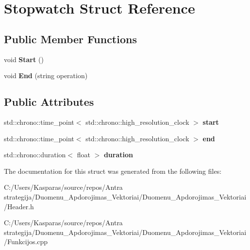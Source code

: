 \hypertarget{struct_stopwatch}{}\section{Stopwatch Struct Reference}
\label{struct_stopwatch}
\subsection*{Public Member Functions}
\begin{DoxyCompactItemize}
\item 
\mbox{\label{struct_stopwatch_adb93923510f12409132445fc187d828f}} 
void {\bfseries Start} ()
\item 
\mbox{\label{struct_stopwatch_a5fed6799222f1a0829df7e9eefaca3e4}} 
void {\bfseries End} (string operation)
\end{DoxyCompactItemize}
\subsection*{Public Attributes}
\begin{DoxyCompactItemize}
\item 
\mbox{\label{struct_stopwatch_aafe0ac2c25c4ecddd921562d765aef83}} 
std\+::chrono\+::time\+\_\+point$<$ std\+::chrono\+::high\+\_\+resolution\+\_\+clock $>$ {\bfseries start}
\item 
\mbox{\label{struct_stopwatch_a1827689dd0b76628b8d1861a27fb8fad}} 
std\+::chrono\+::time\+\_\+point$<$ std\+::chrono\+::high\+\_\+resolution\+\_\+clock $>$ {\bfseries end}
\item 
\mbox{\label{struct_stopwatch_a1779261e916c1cc75ac166f1cf583e5b}} 
std\+::chrono\+::duration$<$ float $>$ {\bfseries duration}
\end{DoxyCompactItemize}


The documentation for this struct was generated from the following files\+:\begin{DoxyCompactItemize}
\item 
C\+:/\+Users/\+Kasparas/source/repos/\+Antra strategija/\+Duomenu\+\_\+\+Apdorojimas\+\_\+\+Vektoriai/\+Duomenu\+\_\+\+Apdorojimas\+\_\+\+Vektoriai/Header.\+h\item 
C\+:/\+Users/\+Kasparas/source/repos/\+Antra strategija/\+Duomenu\+\_\+\+Apdorojimas\+\_\+\+Vektoriai/\+Duomenu\+\_\+\+Apdorojimas\+\_\+\+Vektoriai/Funkcijos.\+cpp\end{DoxyCompactItemize}
